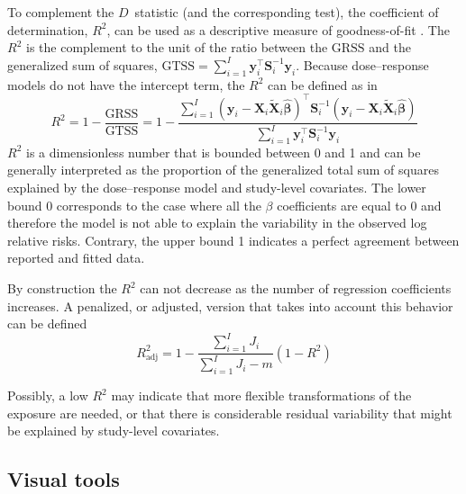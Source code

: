\documentclass[11pt,a4paper,twoside,openany]{book}\usepackage{knitr}
\begin{document}
{{To complement the $D$~statistic (and the corresponding test), the coefficient of determination, $R^2$, can be used as a descriptive measure of goodness-of-fit \citep{hagquist1998goodness, kvaalseth1985cautionary}. The $R^2$ is the complement to the unit of the ratio between the $\textrm{GRSS}$ and the generalized sum of squares, $\textrm{GTSS} = \sum_{i=1}^I\mathbf{y}_i^\top \mathbf{S}_i^{-1} \mathbf{y}_i$. Because dose--response models do not have the intercept term, the $R^2$ can be defined as in \citep{buse1973goodness, theil1958economic}
\begin{equation}
R^2 = 1 - \frac{\textrm{GRSS}}{\textrm{GTSS}} = 1 - \frac{\sum_{i=1}^I \left(\mathbf{y}_i - \mathbf{X}_i \widetilde{\mathbf{X}}_i \boldsymbol{\hat \beta} \right)^\top \mathbf{S}_i^{-1} \left(\mathbf{y}_i - \mathbf{X}_i \widetilde{\mathbf{X}}_i \boldsymbol{\hat \beta} \right)}{\sum_{i=1}^I \mathbf{y}_i^\top \mathbf{S}_i^{-1} \mathbf{y}_i}
\label{eq:R2}
\end{equation}
\noindent $R^2$ is a dimensionless number that is bounded between 0 and 1 and can be generally interpreted as the proportion of the generalized total sum of squares explained by the dose--response model and study-level covariates. The lower bound 0 corresponds to the case where all the $\beta$ coefficients are equal to 0 and therefore the model is not able to explain the variability in the observed log relative risks. Contrary, the upper bound 1 indicates a perfect agreement between reported and fitted data. 

By construction the $R^2$ can not decrease as the number of regression coefficients increases. A penalized, or adjusted, version that takes into account this behavior can be defined
\begin{equation}
R^2_{\textrm{adj}} = 1 - \frac{\sum_{i=1}^I J_i}{\sum_{i=1}^I J_i-m} \left(1 - R^2 \right)
\label{eq:R2adj}
\end{equation}

Possibly, a low $R^2$ may indicate that more flexible transformations of the exposure are needed, or that there is considerable residual variability that might be explained by study-level covariates.

\subsection{Visual tools}



}}
\end{document}
